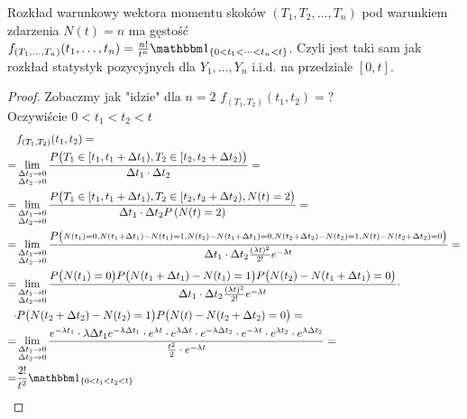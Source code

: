 \begin{twr}
Rozkład warunkowy wektora momentu skoków $ \left(T_1,T_2,\dots,T_n\right) $ pod warunkiem zdarzenia $ N(t)=n $ ma gęstość $ f_{(T_1,\dots,T_n)}(t_1,\dots,t_n)=\frac{n!}{t^n}\mathbbm1_{\{0<t_1<\dots<t_n<t\}} $. Czyli jest taki sam jak rozkład statystyk pozycyjnych dla $ Y_1,\dots,Y_n$ i.i.d. na przedziale $ [0,t] $.
\begin{proof}
Zobaczmy jak "idzie" dla $ n=2 $ $ f_{(T_1,T_2)}(t_1,t_2)=? $\\
Oczywiście $ 0<t_1<t_2<t $
\begin{align*}
&f_{(T_1,T_2)}(t_1,t_2)
=\\=&
\lim\limits_{\substack{\Delta t_1\to0\\\Delta t_2\to0}}
\frac{P\bigl(T_1\in[t_1,t_1+\Delta t_1),T_2\in[t_2,t_2+\Delta t_2)\bigr)}{\Delta t_1\cdot \Delta t_2}
=\\=&
\lim\limits_{\substack{\Delta t_1\to0\\\Delta t_2\to0}}
\frac{P\bigl(T_1\in[t_1,t_1+\Delta t_1),T_2\in[t_2,t_2+\Delta t_2),N(t)=2\bigr)}{\Delta t_1\cdot \Delta t_2P\left(N(t)=2\right)}
=\\=&
\lim\limits_{\substack{\Delta t_1\to0\\\Delta t_2\to0}}
\frac{P\bigl(
\substack{N(t_1)=0,N(t_1+\Delta t_1)-N(t_1)=1,N(t_2)-N(t_1+\Delta t_1)=0,N(t_2+\Delta t_2)-N(t_2)=1,N(t)-N(t_2+\Delta t_2)=0}
\bigr)}{\Delta t_1\cdot \Delta t_2\frac{(\lambda t)^2}{2!}e^{-\lambda t}}
=\\=&
\lim\limits_{\substack{\Delta t_1\to0\\\Delta t_2\to0}}
\frac{P\bigl(
N(t_1)=0\bigr)P\bigl(N(t_1+\Delta t_1)-N(t_1)=1\bigr)P\bigl(N(t_2)-N(t_1+\Delta t_1)=0\bigr)}{\Delta t_1\cdot \Delta t_2\frac{(\lambda t)^2}{2!}e^{-\lambda t}}
\cdot\\\cdot
&P\bigl(N(t_2+\Delta t_2)-N(t_2)=1\bigr)P\bigl(N(t)-N(t_2+\Delta t_2)=0
\bigr)
=\\=&
\lim\limits_{\substack{\Delta t_1\to0\\\Delta t_2\to0}}
\frac{e^{-\lambda t_1}\cdot \lambda\Delta t_1e^{-\lambda\Delta t_1}\cdot e^{\lambda t}\cdot e^{\lambda\Delta t}\cdot e^{-\lambda\Delta t_2}\cdot e^{-\lambda t}\cdot e^{\lambda t_2}\cdot e^{\lambda\Delta t_2}}{\frac{t^2}{2}\cdot e^{-\lambda t}}
=\\=&
\frac{2!}{t^2}\mathbbm1_{\left\{0<t_1<t_2<t\right\}}
\end{align*}
\end{proof}
\end{twr}
